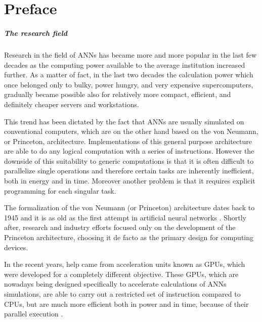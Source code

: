 \chapter*{Preface}

\paragraph{The research field\\}
Research in the field of \acp{ANN} has became more and more popular in the last few decades as the computing power available to the average institution increased further.
As a matter of fact, in the last two decades the calculation power which once belonged only to bulky, power hungry, and very expensive supercomputers, gradually became possible also for relatively more compact, efficient, and definitely cheaper servers and workstations.

This trend has been dictated by the fact that \acp{ANN} are usually simulated on conventional computers, which are on the other hand based on the von Neumann, or Princeton, architecture.
Implementations of this general purpose architecture are able to do any logical computation with a series of instructions.
However the downside of this suitability to generic computations is that it is often difficult to parallelize single operations and therefore certain tasks are inherently inefficient, both in energy and in time.
Moreover another problem is that it requires explicit programming for each singular task.

The formalization of the von Neumann (or Princeton) architecture dates back to 1945 \cite{Godfrey1993} and it is as old as the first attempt in artificial neural networks \cite{Rosenblatt1958}.
Shortly after, research and industry efforts focused only on the development of the Princeton architecture, choosing it de facto as the primary design for computing devices.

In the recent years, help came from acceleration units known as \acp{GPU}, which were developed for a completely different objective.
These GPUs, which are nowadays being designed specifically to accelerate calculations of \acp{ANN} simulations, are able to carry out a restricted set of instruction compared to \acsp{CPU}, but are much more efficient both in power and in time, because of their parallel execution \cite{stone2010opencl,DBLP:journals/corr/abs-1211-5590}.

